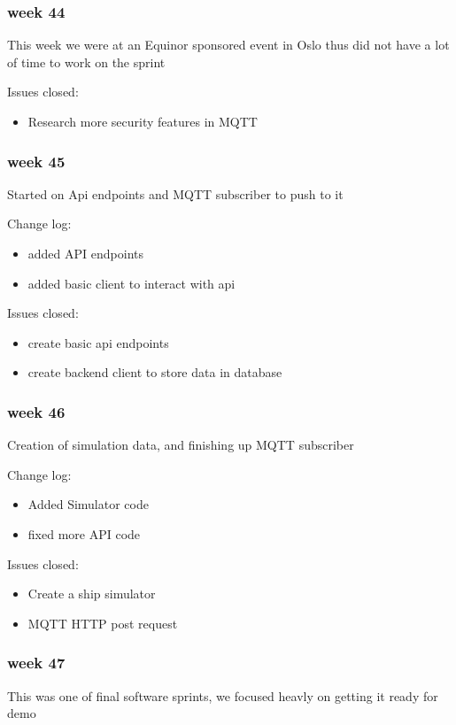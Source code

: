 \documentclass[12pt, a4]{article}
\begin{document}
	\subsubsection{week 44}
	This week we were at an Equinor sponsored event in Oslo thus did not have a lot of time to work on the sprint

	Issues closed:
	\begin{itemize}
		\item Research more security features in MQTT	
	\end{itemize}


	\subsubsection{week 45}
	Started on Api endpoints and MQTT subscriber to push to it

	Change log:
	\begin{itemize}
		\item added API endpoints
		\item added basic client to interact with api
	\end{itemize}

	Issues closed:
	\begin{itemize}
		\item create basic api endpoints
		\item create backend client to store data in database
	\end{itemize}
	\subsubsection{week 46}
	Creation of simulation data, and finishing up MQTT subscriber
	
	Change log:
	\begin{itemize}
		\item Added Simulator code
		\item fixed more API code
	\end{itemize}

	Issues closed:
	\begin{itemize}
		\item Create a ship simulator
		\item MQTT HTTP post request
	\end{itemize}


	\subsubsection{week 47}
	This was one of final software sprints, we focused heavly on getting it ready for demo
	
\end{document}
